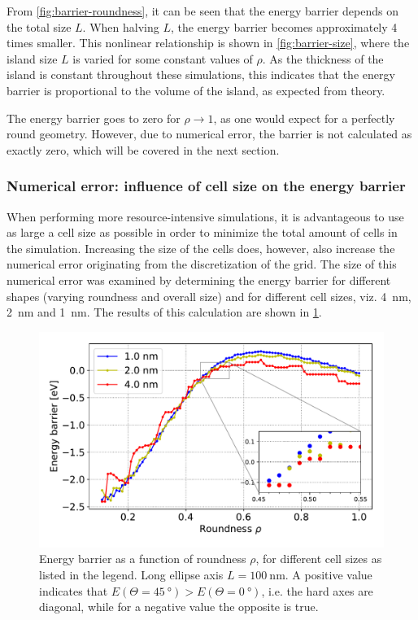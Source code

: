 \documentclass[11pt,a4paper,english,twoside]{article}
\begin{document}
From \cref{fig:barrier-roundness}, it can be seen that the energy barrier depends on the total size $L$. When halving $L$, the energy barrier becomes approximately 4 times smaller. This nonlinear relationship is shown in \cref{fig:barrier-size}, where the island size $L$ is varied for some constant values of $\rho$. As the thickness of the island is constant throughout these simulations, this indicates that the energy barrier is proportional to the volume of the island, as expected from theory. \par
The energy barrier goes to zero for $\rho \rightarrow 1$, as one would expect for a perfectly round geometry. However, due to numerical error, the barrier is not calculated as exactly zero, which will be covered in the next section.

\subsubsection{Numerical error: influence of cell size on the energy barrier}
When performing more resource-intensive simulations, it is advantageous to use as large a cell size as possible in order to minimize the total amount of cells in the simulation. Increasing the size of the cells does, however, also increase the numerical error originating from the discretization of the grid. The size of this numerical error was examined by determining the energy barrier for different shapes (varying roundness and overall size) and for different cell sizes, viz. \SI{4}{\nano\metre}, \SI{2}{\nano\metre} and \SI{1}{\nano\metre}. The results of this calculation are shown in \cref{fig:barrier-cell_size-100nm}. \par
\begin{figure}[b!]
    \centering
    \includegraphics[width=0.9\columnwidth]{Figures/biaxial_island/Barrier/Plus_100_0.1-1_aPi128_B0.01_cell1,2,4nm.pdf}
    \caption{Energy barrier as a function of roundness $\rho$, for different cell sizes as listed in the legend. Long ellipse axis $L=\SI{100}{\nano\metre}$. A positive value indicates that $E(\Theta=\SI{45}{\degree}) > E(\Theta=\SI{0}{\degree})$, i.e. the hard axes are diagonal, while for a negative value the opposite is true.}
    \label{fig:barrier-cell_size-100nm}
\end{figure}
\end{document}
